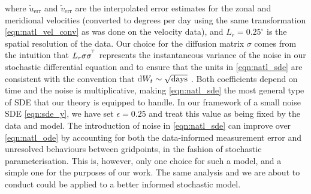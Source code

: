 where \(\tilde{u}_{\mathrm{err}}\) and \(\tilde{v}_{\mathrm{err}}\) are the interpolated error estimates for the zonal and meridional velocities (converted to degrees per day using the same transformation \cref{eqn:natl_vel_conv} as was done on the velocity data), and \(L_r = 0.25^\circ\) is the spatial resolution of the data.
Our choice for the diffusion matrix \(\sigma\) comes from the intuition that \(L_r\sigma\sigma^{^{\!\top}}\) represents the instantaneous variance of the noise in our stochastic differential equation and to ensure that the units in \cref{eqn:natl_sde} are consistent with the convention that \(\dif W_t \sim \sqrt{\mathrm{days}}\) \citep{Oksendal_2003_StochasticDifferentialEquations}.
Both coefficients depend on time and the noise is multiplicative, making \cref{eqn:natl_sde} the most general type of SDE that our theory is equipped to handle.
In our framework of a small noise SDE \cref{eqn:sde_y}, we have set \(\epsilon = 0.25\) and treat this value as being fixed by the data and model.
The introduction of noise in \cref{eqn:natl_sde} can improve over \cref{eqn:natl_ode} by accounting for both the data-informed measurement error and unresolved behaviours between gridpoints, in the fashion of stochastic parameterisation.
This is, however, only one choice for such a model, and a simple one for the purposes of our work.
The same analysis and we are about to conduct could be applied to a better informed stochastic model.









